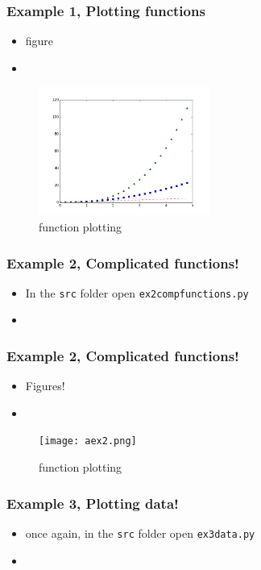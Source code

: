 \documentclass{beamer}
\begin{document}
\begin{frame}
\frametitle{Example 1, Plotting functions}
\begin{itemize}
	\item figure 
	\item  
\end{itemize}
\begin{figure}
	\centering
	\includegraphics[width=0.5\textwidth]{ex1.png}
	\caption{function plotting}
	\label{fig:function}
\end{figure}
\end{frame}

\begin{frame}
\frametitle{Example 2, Complicated functions!}
\begin{itemize}
\item In the \texttt{src} folder open \texttt{ex2compfunctions.py} 
\item
\end{itemize}
\end{frame}

\begin{frame}
\frametitle{Example 2, Complicated functions!}
\begin{itemize}
\item Figures!
\item
\end{itemize}
\begin{figure}
	\centering
	\texttt{[image: aex2.png]}
	\caption{function plotting}
	\label{fig:function}
\end{figure}
\end{frame}


\begin{frame}
\frametitle{Example 3, Plotting data!}
\begin{itemize}
	\item once again, in the \texttt{src} folder open \texttt{ex3data.py}
	\item
\end{itemize}
\end{frame}
\end{document}
